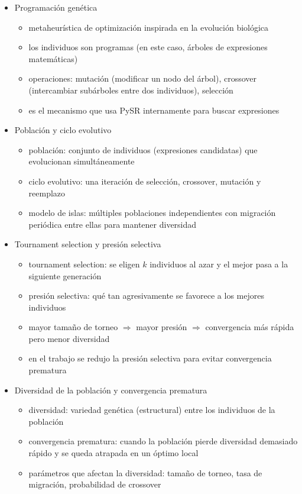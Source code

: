 \documentclass{article}
\begin{document}
\begin{itemize}[leftmargin=1.5em]
  \item Programación genética
  \begin{itemize}
\item metaheurística de optimización inspirada en la evolución biológica \item los individuos son programas (en este caso, árboles de expresiones matemáticas) \item operaciones: mutación (modificar un nodo del árbol), crossover (intercambiar subárboles entre dos individuos), selección \item es el mecanismo que usa PySR internamente para buscar expresiones
  \end{itemize}

  \item Población y ciclo evolutivo
  \begin{itemize}
\item población: conjunto de individuos (expresiones candidatas) que evolucionan simultáneamente \item ciclo evolutivo: una iteración de selección, crossover, mutación y reemplazo \item modelo de islas: múltiples poblaciones independientes con migración periódica entre ellas para mantener diversidad
  \end{itemize}

  \item Tournament selection y presión selectiva
  \begin{itemize}
\item tournament selection: se eligen $k$ individuos al azar y el mejor pasa a la siguiente generación \item presión selectiva: qué tan agresivamente se favorece a los mejores individuos \item mayor tamaño de torneo $\Rightarrow$ mayor presión $\Rightarrow$ convergencia más rápida pero menor diversidad \item en el trabajo se redujo la presión selectiva para evitar convergencia prematura
  \end{itemize}

  \item Diversidad de la población y convergencia prematura
  \begin{itemize}
\item diversidad: variedad genética (estructural) entre los individuos de la población \item convergencia prematura: cuando la población pierde diversidad demasiado rápido y se queda atrapada en un óptimo local \item parámetros que afectan la diversidad: tamaño de torneo, tasa de migración, probabilidad de crossover
  \end{itemize}


\end{itemize}
\end{document}

